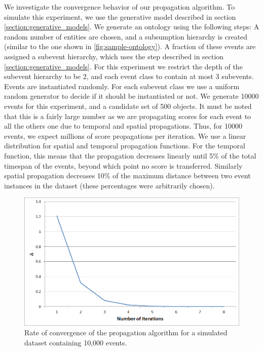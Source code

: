 We investigate the convergence behavior of our propagation algorithm. To simulate this experiment, we use the generative model described in section \ref{section:generative_models}. We generate an ontology using the following steps: A random number of entities are chosen, and a subsumption hierarchy is created (similar to the one shown in \ref{fig:sample-ontology}). A fraction of these events are assigned a subevent hierarchy, which uses the step described in section \ref{section:generative_models}. For this experiment we restrict the depth of the subevent hierarchy to be 2, and each event class to contain at most 3 subevents. Events are instantiated randomly. For each subevent class we use a uniform random generator to decide if it should be instantiated or not. We generate 10000 events for this experiment, and a candidate set of 500 objects. It must be noted that this is a fairly large number as we are propagating scores for each event to all the others one due to temporal and spatial propagations. Thus, for 10000 events, we expect millions of score propagations per iteration. We use a linear distribution for spatial and temporal propagation functions. For the temporal function, this means that the propagation decreases linearly until 5\% of the total timespan of the events, beyond which point no score is transferred. Similarly spatial propagation decreases 10\% of the maximum distance between two event instances in the dataset (these percentages were arbitrarily chosen).

\begin{figure}[h!]
\centering
\includegraphics[width=\textwidth]{media/chapter6/conv/convergence-10K.png}
\caption{Rate of convergence of the propagation algorithm for a simulated dataset containing 10,000 events.}
\label{fig:convergences}
\end{figure}

